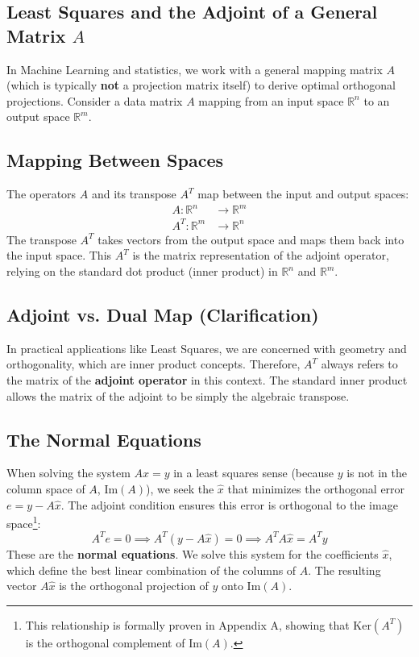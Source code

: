 \begin{notechapter}
\section{Least Squares and the Adjoint of a General Matrix $A$}

In Machine Learning and statistics, we work with a general mapping matrix $A$ (which is typically \textbf{not} a projection matrix itself) to derive optimal orthogonal projections. Consider a data matrix $A$ mapping from an input space $\mathbb{R}^n$ to an output space $\mathbb{R}^m$.

\subsection{Mapping Between Spaces}
The operators $A$ and its transpose $A^T$ map between the input and output spaces:
\begin{align*}
A: \mathbb{R}^n &\to \mathbb{R}^m \\
A^T: \mathbb{R}^m &\to \mathbb{R}^n
\end{align*}
The transpose $A^T$ takes vectors from the output space and maps them back into the input space. This $A^T$ is the matrix representation of the adjoint operator, relying on the standard dot product (inner product) in $\mathbb{R}^n$ and $\mathbb{R}^m$.

\subsection{Adjoint vs. Dual Map (Clarification)}
In practical applications like Least Squares, we are concerned with geometry and orthogonality, which are inner product concepts. Therefore, $A^T$ always refers to the matrix of the \textbf{adjoint operator} in this context. The standard inner product allows the matrix of the adjoint to be simply the algebraic transpose.

\subsection{The Normal Equations}

When solving the system $A\hat{x} = y$ in a least squares sense (because $y$ is not in the column space of $A$, $\text{Im}(A)$), we seek the $\hat{x}$ that minimizes the orthogonal error $e = y - A\hat{x}$. The adjoint condition ensures this error is orthogonal to the image space\footnote{This relationship is formally proven in Appendix A, showing that $\text{Ker}(A^T)$ is the orthogonal complement of $\text{Im}(A)$.}:
$$A^T e = 0 \implies A^T(y - A\hat{x}) = 0 \implies A^TA\hat{x} = A^Ty$$
These are the \textbf{normal equations}. We solve this system for the coefficients $\hat{x}$, which define the best linear combination of the columns of $A$. The resulting vector $A\hat{x}$ is the orthogonal projection of $y$ onto $\text{Im}(A)$.


\end{notechapter}
